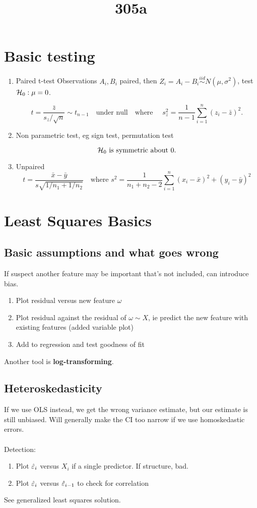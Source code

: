 \documentclass{article}
\title{305a}
\newcommand{\simiid}{\overset{iid}\sim }
\begin{document}
\maketitle
\section{Basic testing}
\begin{enumerate}
    \item Paired t-test
Observations $A_i, B_i$ paired, then $Z_i=A_i - B_i \simiid N(\mu, \sigma^2)$, test $\mathcal H_0 : \mu=0$. 

$$t = \frac{\bar z}{s_z/\sqrt{n}} \sim t_{n-1} \quad \text {under null} \quad \text {where } \quad s_z^2 = \frac{1}{n-1} \sum_{i=1}^n (z_i- \bar z)^2.$$

\item Non parametric test, eg sign test, permutation test


$$\mathcal H_0 \text{ is symmetric about } 0.$$

\item Unpaired 
$$t = \frac{\bar x - \bar y}{s \sqrt{1/n_1 + 1/n_2}} \quad \text {where } s^2 = \frac 1 {n_1 + n_2 -2} \sum_{i=1}^n (x_i - \bar x)^2  + (y_i -\bar y)^2 $$

\end{enumerate}

\section{Least Squares Basics}

\subsection{Basic assumptions and what goes wrong}
If suspect another feature may be important that's not included, can introduce bias.
\begin{enumerate}
	\item Plot residual versus new feature $\omega$
	\item Plot residual against the residual of $\omega \sim X$, ie predict the new feature with existing features (added variable plot)
	\item Add to regression and test goodness of fit 
\end{enumerate}
Another tool is \textbf{log-transforming}. 

\subsection{Heteroskedasticity}
 If we use OLS instead, we get the wrong variance estimate, but our estimate is still unbiased. Will generally make the CI too narrow if we use homoskedastic errors.\\\\
Detection:
\begin{enumerate}
	\item Plot $\hat {\varepsilon}_i$ versus $X_i$ if a single predictor. If structure, bad.
	\item Plot $\hat {\varepsilon}_i$ versus $\hat {\varepsilon}_{i-1}$ to check for correlation
\end{enumerate}
See generalized least squares solution.
\end{document}
